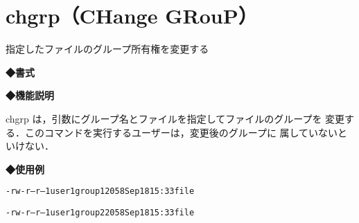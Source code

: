 
\section{chgrp（CHange GRouP）}
指定したファイルのグループ所有権を変更する\par
\label{cmd:chgrp}
\noindent
{\bf ◆書式}
\begin{center}
\begin{screen}
\begin{alltt}
% chgrp グループ名 ファイル名
\end{alltt}
\end{screen}
\end{center}

\noindent
{\bf ◆機能説明}

chgrp は，引数にグループ名とファイルを指定してファイルのグループを
変更する．このコマンドを実行するユーザーは，変更後のグループに
属していないといけない．

\noindent
{\bf ◆使用例}
\begin{center}
\begin{breakbox}
\begin{alltt}
% \underline{ls -l file}  （←fileの詳細な情報を表示する）
-rw-r--r--   1 user1   group1  2058 Sep 18 15:33 file

% \underline{chgrp  group2 file}  （←fileの所属するグループをgroup2に変更する）
% \underline{ls -l file}
-rw-r--r--   1 user1   group2  2058 Sep 18 15:33 file
%
\end{alltt}
\end{breakbox}
\end{center}
\clearpage
